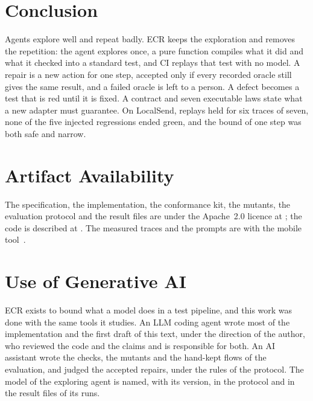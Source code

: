 \section{Conclusion}
\label{sec:conclusion}

Agents explore well and repeat badly. ECR keeps the exploration and removes the repetition: the agent explores once, a pure function compiles what it did and what it checked into a standard test, and CI replays that test with no model. A repair is a new action for one step, accepted only if every recorded oracle still gives the same result, and a failed oracle is left to a person. A defect becomes a test that is red until it is fixed. A contract and seven executable laws state what a new adapter must guarantee. On LocalSend, replays held for six traces of seven, none of the five injected regressions ended green, and the bound of one step was both safe and narrow.

\section*{Artifact Availability}

The specification, the implementation, the conformance kit, the mutants, the evaluation protocol and the result files are under the Apache~2.0 licence at \ecrartifact; the code is described at \ecrcommit{}. The measured traces and the prompts are with the mobile tool~\matcite.

\section*{Use of Generative AI}

ECR exists to bound what a model does in a test pipeline, and this work was done with the same tools it studies. An LLM coding agent wrote most of the implementation and the first draft of this text, under the direction of the author, who reviewed the code and the claims and is responsible for both. An AI assistant wrote the checks, the mutants and the hand-kept flows of the evaluation, and judged the accepted repairs, under the rules of the protocol. The model of the exploring agent is named, with its version, in the protocol and in the result files of its runs.
